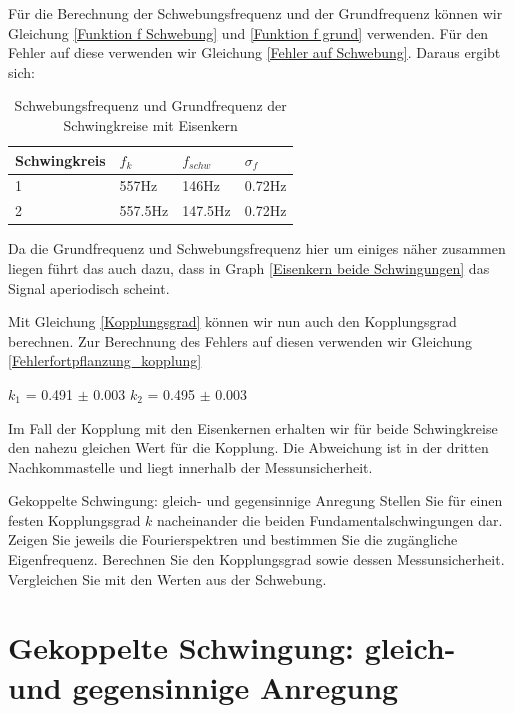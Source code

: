 \documentclass[twoside]{protokoll}
\begin{document}
Für die Berechnung der Schwebungsfrequenz und der Grundfrequenz können wir Gleichung \ref{Funktion f Schwebung} und \ref{Funktion f grund} verwenden. 
Für den Fehler auf diese verwenden wir Gleichung \ref{Fehler auf Schwebung}.
Daraus ergibt sich:

\begin{table}[H]
    \centering
    \begin{tabularx}{1\textwidth}{X X X X} %
        \toprule
        \textbf{Schwingkreis} & \textbf{$f_k$} & \textbf{$f_{schw}$} & \textbf{$\sigma_f$} \\
        \midrule
        1 & 557Hz & 146Hz & 0.72Hz\\
        2 & 557.5Hz & 147.5Hz & 0.72Hz \\
        \bottomrule
    \end{tabularx}
    \caption{Schwebungsfrequenz und Grundfrequenz der Schwingkreise mit Eisenkern}
    \label{•}
\end{table} 
Da die Grundfrequenz und Schwebungsfrequenz hier um einiges näher zusammen liegen führt das auch dazu, dass in Graph \ref{Eisenkern beide Schwingungen} das Signal aperiodisch scheint.

Mit Gleichung \ref{Kopplungsgrad} können wir nun auch den Kopplungsgrad berechnen. Zur Berechnung des Fehlers auf diesen verwenden wir Gleichung \ref{Fehlerfortpflanzung_kopplung}

\begin{center}
$k_1$ = 0.491 $\pm$ 0.003 \qquad $k_2$ = 0.495 $\pm$ 0.003
\end{center}

Im Fall der Kopplung mit den Eisenkernen erhalten wir für beide Schwingkreise den nahezu gleichen Wert für die Kopplung.
Die Abweichung ist in der dritten Nachkommastelle und liegt innerhalb der Messunsicherheit.

\begin{aufgabe}{Gekoppelte Schwingung: gleich- und gegensinnige Anregung}
  Stellen Sie für einen festen Kopplungsgrad $k$ nacheinander die
  beiden Fundamentalschwingungen dar. Zeigen Sie jeweils die
  Fourierspektren und bestimmen Sie die zugängliche
  Eigenfrequenz. Berechnen Sie den Kopplungsgrad sowie dessen
  Messunsicherheit. Vergleichen Sie mit den Werten aus der Schwebung.
\end{aufgabe}

\section{Gekoppelte Schwingung: gleich- und gegensinnige Anregung}
\end{document}
